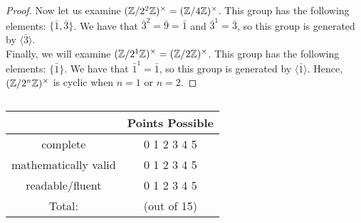 \documentclass[11pt, reqno]{amsart}
\theoremstyle{plain}
\theoremstyle{definition}
\theoremstyle{example}
\newcommand{\Rubric}[1]{$~$\\\vfill \hfill{\def\arraystretch{1.75}\begin{tabular} {|c|c|} \hline
#1 & Points Possible  \\ \hline \hline
complete & \hspace{3mm} 0 \hspace{3mm} 1 \hspace{3mm} 2 \hspace{3mm} 
			3 \hspace{3mm} 4 \hspace{3mm} 5 \hspace{3mm} \\ \hline
mathematically valid & \hspace{3mm} 0 \hspace{3mm} 1 \hspace{3mm} 2 \hspace{3mm} 
			3 \hspace{3mm} 4 \hspace{3mm} 5 \hspace{3mm} \\ \hline
readable/fluent & \hspace{3mm} 0 \hspace{3mm} 1 \hspace{3mm} 2 \hspace{3mm} 
			3 \hspace{3mm} 4 \hspace{3mm} 5 \hspace{3mm} \\ \hline
Total:& \qquad\qquad\qquad(out of 15)\\
\hline
\end{tabular}}
\pagebreak}
\begin{document}
\begin{proof}
Now let us examine $(\mathbb{Z}/2^2\mathbb{Z})^{\times} = (\mathbb{Z}/4\mathbb{Z})^{\times}$. This group has the following elements: $\{\bar{1}, \bar{3}\}$. We have that $\bar{3}^2 = \bar{9} = \bar{1}$ and $\bar{3}^1 = \bar{3}$, so this group is generated by $\langle \bar{3} \rangle$.\\

Finally, we will examine $(\mathbb{Z}/2^1\mathbb{Z})^{\times} = (\mathbb{Z}/2\mathbb{Z})^{\times}$. This group has the following elements: $\{\bar{1}\}$. We have that $\bar{1}^1 = \bar{1}$, so this group is generated by $\langle \bar{1} \rangle$. Hence, $(\mathbb{Z}/2^n\mathbb{Z})^\times$ is cyclic when $n = 1$ or $n = 2$.
\end{proof}

\Rubric{}
\end{document}
